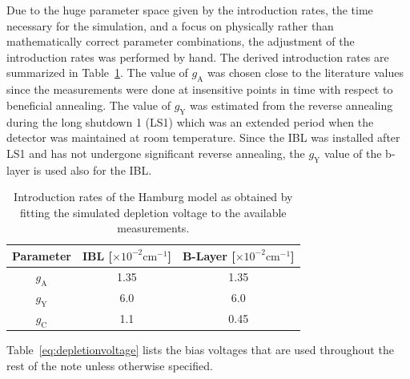 Due to the huge parameter space given by the introduction rates, the time necessary for the simulation, and a focus on physically rather than mathematically correct parameter combinations, the adjustment of the introduction rates was performed by hand. The derived introduction rates are summarized in Table~\ref{tab:depletionvoltage:introductionrates}.  The value of $g_\text{A}$ was chosen close to the literature values since the measurements were done at insensitive points in time with respect to beneficial annealing. The value of $g_\text{Y}$ was estimated from the reverse annealing during the long shutdown 1 (LS1) which was an extended period when the detector was maintained at room temperature. Since the IBL was installed after LS1 and has not undergone significant reverse annealing, the $g_\text{Y}$ value of the b-layer is used also for the IBL. %

\begin{table}[!htpb]
\caption{Introduction rates of the Hamburg model as obtained by fitting the simulated depletion voltage to the available measurements.}
\label{tab:depletionvoltage:introductionrates}
\centering
\begin{tabular}{ccc}
  \hline
   Parameter & IBL [$\times 10^{-2} \text{cm}^{-1}$] & B-Layer [$\times 10^{-2} \text{cm}^{-1}$]	\\
   \hline
   \hline	
$g_\text{A}$ & 1.35 & 1.35\\
$g_\text{Y}$ & 6.0 & 6.0\\
$g_\text{C}$ & 1.1 & 0.45\\
  \hline  
\end{tabular}
\end{table}



Table~\ref{eq:depletionvoltage} lists the bias voltages that are used throughout the rest of the note unless otherwise specified.

